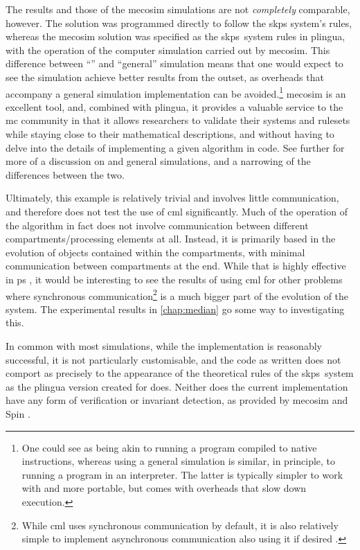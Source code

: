 The \fsharp{} results and those of the \gls{mecosim} simulations are not \emph{completely} comparable, however.  The \fsharp{} solution was programmed directly to follow the \gls{skps} system's rules, whereas the \gls{mecosim} solution was specified as the \gls{skps}~system rules in \gls{plingua}, with the operation of the computer simulation carried out by \gls{mecosim}.  This difference between ``\adhoc{}'' and ``general'' simulation means that one would expect to see the \fsharp{} simulation achieve better results from the outset, as overheads that accompany a general simulation implementation can be avoided.\footnote{One could see \adhoc{} as being akin to running a program compiled to native instructions, whereas using a general simulation is similar, in principle, to running a program in an interpreter.  The latter is typically simpler to work with and more portable, but comes with overheads that slow down execution.}  \Gls{mecosim} is an excellent tool, and, combined with \gls{plingua}, it provides a valuable service to the \gls{mc} community in that it allows researchers to validate their systems and \glspl{ruleset} while staying close to their mathematical descriptions, and without having to delve into the details of implementing a given algorithm in code.  See further \cite{Perez-Hurtado2019} for more of a discussion on \adhoc{} and general simulations, and a narrowing of the differences between the two.

Ultimately, this example is relatively trivial and involves little communication, and therefore does not test the use of \gls{cml} significantly.  Much of the operation of the algorithm in fact does not involve communication between different \glspl{compartment}/processing elements at all.  Instead, it is primarily based in the evolution of objects contained within the \glspl{compartment}, with minimal communication between \glspl{compartment} at the end.  While that is highly effective in \gls{ps} \cite{Paun2008}, it would be interesting to see the results of using \gls{cml} for other problems where synchronous communication\footnote{While \gls{cml} uses synchronous communication by default, it is also relatively simple to implement asynchronous communication also using it if desired \cite{Reppy2007}.} is a much bigger part of the evolution of the system.  The experimental results in \cref{chap:median} go some way to investigating this.

In common with most \adhoc{} simulations, while the implementation is reasonably successful, it is not particularly customisable, and the code as written does not comport as precisely to the appearance of the theoretical rules of the \gls{skps}~system as the \gls{plingua} version created for \cite{Gheorghe2013} does.  Neither does the current implementation have any form of verification or invariant detection, as provided by \gls{mecosim} \cite{Perez-Hurtado2010} and Spin \cite{Ben-Ari2008,Lefticaru2011}.

